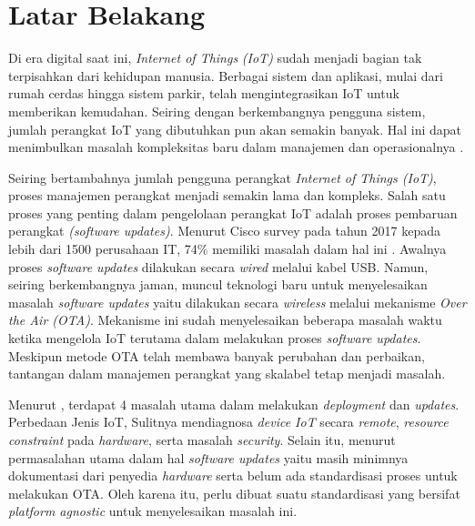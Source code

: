 \section{Latar Belakang}
\label{sec:latar-belakang}

Di era digital saat ini, \textit{Internet of Things} \textit{(IoT)} sudah menjadi bagian tak terpisahkan dari kehidupan manusia. Berbagai sistem dan aplikasi, mulai dari rumah cerdas hingga sistem parkir, telah mengintegrasikan IoT untuk memberikan kemudahan. Seiring dengan berkembangnya pengguna sistem, jumlah perangkat IoT yang dibutuhkan pun akan semakin banyak. Hal ini dapat menimbulkan masalah kompleksitas baru dalam manajemen dan operasionalnya \parencite{IOTSmartCity}.

Seiring bertambahnya jumlah pengguna perangkat \textit{Internet of Things (IoT)}, proses manajemen perangkat menjadi semakin lama dan kompleks. Salah satu proses yang penting dalam pengelolaan perangkat IoT adalah proses pembaruan perangkat \textit{(software updates)}. Menurut Cisco survey pada tahun 2017 kepada lebih dari 1500 perusahaan IT, 74\% memiliki masalah dalam hal ini \parencite{RemoteDeployment}. Awalnya proses \textit{software updates} dilakukan secara \textit{wired} melalui kabel USB. Namun, seiring berkembangnya jaman, muncul teknologi baru untuk menyelesaikan masalah \textit{software updates} yaitu dilakukan secara \textit{wireless} melalui mekanisme \textit{Over the Air (OTA)}. Mekanisme ini sudah menyelesaikan beberapa masalah waktu ketika mengelola IoT terutama dalam melakukan proses \textit{software updates}. Meskipun metode OTA telah membawa banyak perubahan dan perbaikan, tantangan dalam manajemen perangkat yang skalabel tetap menjadi masalah. \parencite{ElJaouhari2022}

Menurut \parencite{RemoteDeployment}, terdapat 4 masalah utama dalam melakukan \textit{deployment} dan \textit{updates}. Perbedaan Jenis IoT, Sulitnya mendiagnosa \textit{device IoT} secara \textit{remote}, \textit{resource constraint} pada \textit{hardware}, serta masalah \textit{security}. Selain itu, menurut \parencite{studyovertheair1} permasalahan utama dalam hal \textit{software updates} yaitu masih minimnya dokumentasi dari penyedia \textit{hardware} serta belum ada standardisasi proses untuk melakukan OTA. Oleh karena itu, perlu dibuat suatu standardisasi yang bersifat \textit{platform agnostic} untuk menyelesaikan masalah ini. 

